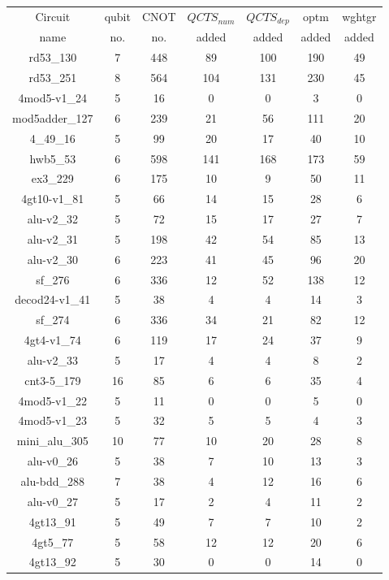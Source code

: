 \documentclass[runningheads]{llncs}
\begin{document}
	\begin{table}[H]
		\begin{center}  
		\begin{tabular}{|c|c|c|c|c|c|c|}
		\hline
		Circuit &  qubit  & CNOT &$QCTS_{num}$& $QCTS_{dep}$  & optm 	 & wghtgr 	\\
		 name	&   no. 	&	no. & added&  added &  added 	&  added\\
		\hline
		rd53\_130 & 7 & 448 & 89 & 100 & 190 & 49 \\ 
rd53\_251 & 8 & 564 & 104 & 131 & 230 & 45 \\ 
4mod5-v1\_24 & 5 & 16 & 0 & 0 & 3 & 0 \\ 
mod5adder\_127 & 6 & 239 & 21 & 56 & 111 & 20 \\ 
4\_49\_16 & 5 & 99 & 20 & 17 & 40 & 10 \\ 
hwb5\_53 & 6 & 598 & 141 & 168 & 173 & 59 \\ 
ex3\_229 & 6 & 175 & 10 & 9 & 50 & 11 \\ 
4gt10-v1\_81 & 5 & 66 & 14 & 15 & 28 & 6 \\ 
alu-v2\_32 & 5 & 72 & 15 & 17 & 27 & 7 \\ 
alu-v2\_31 & 5 & 198 & 42 & 54 & 85 & 13 \\ 
alu-v2\_30 & 6 & 223 & 41 & 45 & 96 & 20 \\ 
sf\_276 & 6 & 336 & 12 & 52 & 138 & 12 \\ 
decod24-v1\_41 & 5 & 38 & 4 & 4 & 14 & 3 \\ 
sf\_274 & 6 & 336 & 34 & 21 & 82 & 12 \\ 
4gt4-v1\_74 & 6 & 119 & 17 & 24 & 37 & 9 \\ 
alu-v2\_33 & 5 & 17 & 4 & 4 & 8 & 2 \\ 
cnt3-5\_179 & 16 & 85 & 6 & 6 & 35 & 4 \\ 
4mod5-v1\_22 & 5 & 11 & 0 & 0 & 5 & 0 \\ 
4mod5-v1\_23 & 5 & 32 & 5 & 5 & 4 & 3 \\ 
mini\_alu\_305 & 10 & 77 & 10 & 20 & 28 & 8 \\ 
alu-v0\_26 & 5 & 38 & 7 & 10 & 13 & 3 \\ 
alu-bdd\_288 & 7 & 38 & 4 & 12 & 16 & 6 \\ 
alu-v0\_27 & 5 & 17 & 2 & 4 & 11 & 2 \\ 
4gt13\_91 & 5 & 49 & 7 & 7 & 10 & 2 \\ 
4gt5\_77 & 5 & 58 & 12 & 12 & 20 & 6 \\ 
4gt13\_92 & 5 & 30 & 0 & 0 & 14 & 0 \\ 

\end{tabular}
\end{center}
\end{table}
\end{document}
